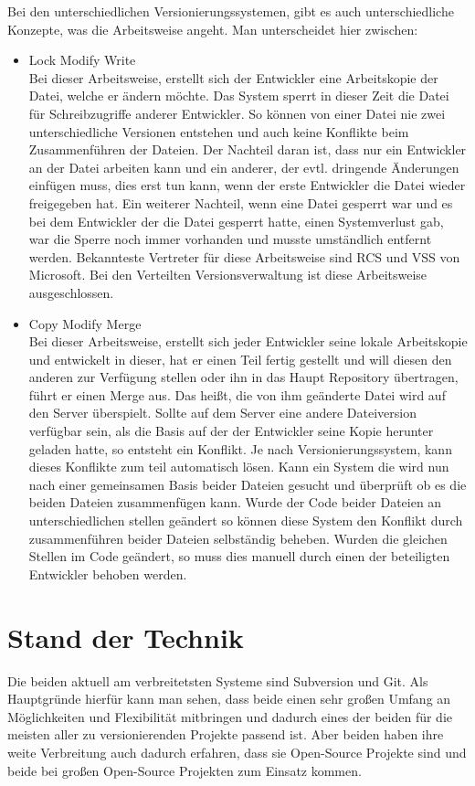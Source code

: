 Bei den unterschiedlichen Versionierungssystemen, gibt es auch unterschiedliche Konzepte, was die Arbeitsweise angeht. Man unterscheidet hier zwischen:
\begin{itemize}
\item Lock Modify Write\\
Bei dieser Arbeitsweise, erstellt sich der Entwickler eine Arbeitskopie der Datei, welche er ändern möchte. Das System sperrt in dieser Zeit die Datei für Schreibzugriffe anderer Entwickler. So können von einer Datei nie zwei unterschiedliche Versionen entstehen und auch keine Konflikte beim Zusammenführen der Dateien. Der Nachteil daran ist, dass nur ein Entwickler an der Datei arbeiten kann und ein anderer, der evtl. dringende Änderungen einfügen muss, dies erst tun kann, wenn der erste Entwickler die Datei wieder freigegeben hat. Ein weiterer Nachteil, wenn eine Datei gesperrt war und es bei dem Entwickler der die Datei gesperrt hatte, einen Systemverlust gab, war die Sperre noch immer vorhanden und musste umständlich entfernt werden. Bekannteste Vertreter für diese Arbeitsweise sind RCS und VSS von Microsoft. Bei den Verteilten Versionsverwaltung ist diese Arbeitsweise ausgeschlossen.

\item Copy Modify Merge\\
Bei dieser Arbeitsweise, erstellt sich jeder Entwickler seine lokale Arbeitskopie und entwickelt in dieser, hat er einen Teil fertig gestellt und will diesen den anderen zur Verfügung stellen oder ihn in das Haupt Repository übertragen, führt er einen Merge aus. Das heißt, die von ihm geänderte Datei wird auf den Server überspielt. 
Sollte auf dem Server eine andere Dateiversion verfügbar sein, als die Basis auf der der Entwickler seine Kopie herunter geladen hatte, so entsteht ein Konflikt. 
Je nach Versionierungssystem, kann dieses Konflikte zum teil automatisch lösen. 
Kann ein System die wird nun nach einer gemeinsamen Basis beider Dateien gesucht und überprüft ob es die beiden Dateien zusammenfügen kann. Wurde der Code beider Dateien an unterschiedlichen stellen geändert so können diese System den Konflikt durch zusammenführen beider Dateien selbständig beheben. Wurden die gleichen Stellen im Code geändert, so muss dies manuell durch einen der beteiligten Entwickler behoben werden. 
\end{itemize}

\section{Stand der Technik}
Die beiden aktuell am verbreitetsten Systeme sind Subversion und Git. Als Hauptgründe hierfür kann man sehen, dass beide einen sehr großen Umfang an Möglichkeiten und Flexibilität mitbringen und dadurch eines der beiden für die meisten aller zu versionierenden Projekte passend ist. Aber beiden haben ihre weite Verbreitung auch dadurch erfahren, dass sie Open-Source Projekte sind und beide bei großen Open-Source Projekten zum Einsatz kommen.

